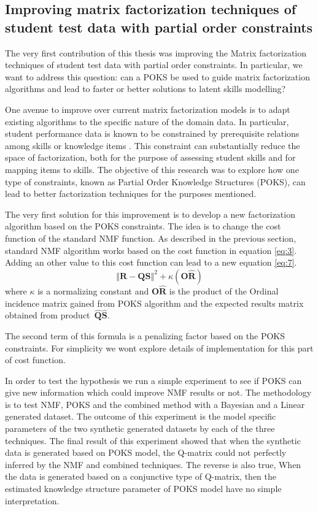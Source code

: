 \subsection{Improving matrix factorization techniques of student test data with partial order constraints}
\label{firstcont}

The very first contribution of this thesis was improving the Matrix factorization techniques of student test data with partial order constraints. In particular, we want to address this question: can a \ac{POKS} be used to guide matrix factorization algorithms and lead to faster or better solutions to latent skills modelling?

One avenue to improve over current matrix factorization models is to adapt existing algorithms to the specific nature of the domain data.  In particular, student performance data is known to be constrained by prerequisite relations among skills or knowledge items \cite{falmagne:1990,Doignon1999}.  This constraint can substantially reduce the space of factorization, both for the purpose of assessing student skills and for mapping items to skills.  The objective of this research was to explore how one type of constraints, known as Partial Order Knowledge Structures (POKS), can lead to better factorization techniques for the purposes mentioned.

The very first solution for this improvement is to develop a new factorization algorithm based on the \ac{POKS} constraints. The idea is to change the cost function of the standard \ac{NMF} function. As described in the previous section, standard \ac{NMF} algorithm works based on the cost function in equation \ref{eq:3}. Adding an other value to this cost function can lead to a new equation \ref{eq:7}. 
\begin{equation}
\left\Vert \mathbf{R}-\mathbf{Q}\mathbf{S}\right\Vert ^{2}+\kappa (\mathbf{O}\hat{\mathbf{R}})\label{eq:7}
\end{equation}
where $\kappa$ is a normalizing constant and $\mathbf{O}\hat{\mathbf{R}}$ is the product of the Ordinal incidence matrix gained from POKS algorithm and the expected results matrix obtained from product~$\mathbf{\hat{Q}}\mathbf{\hat{S}}$.

The second term of this formula is a penalizing factor based on the \ac{POKS} constraints. For simplicity we wont explore details of implementation for this part of cost function. 

In order to test the hypothesis we run a simple experiment to see if POKS can give new information which could improve NMF results or not. The methodology is to test NMF, POKS and the combined method with a Bayesian and a Linear generated dataset. The outcome of this experiment is the model specific parameters of the two synthetic generated datasets by each of the three techniques. The final result of this experiment showed that when the synthetic data is generated based on POKS model, the Q-matrix could not perfectly inferred by the NMF and combined techniques. The reverse is also true, When the data is generated based on a conjunctive type of Q-matrix, then the estimated knowledge structure parameter of POKS model have no simple interpretation.



